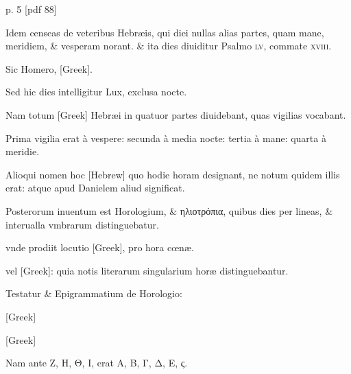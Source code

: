 \clearpage
p. 5 [pdf 88]
\begin{parnumbers}
Idem censeas de veteribus Hebræis,
qui diei nullas alias partes, quam mane, meridiem, \& vesperam norant.
\& ita dies diuiditur Psalmo \textsc{lv}, commate \textsc{xviii}.

Sic Homero,
\textgreek{[Greek]}.

Sed hic dies intelligitur Lux, exclusa nocte.

Nam totum \textgreek{[Greek]} Hebræi in quatuor partes diuidebant, quas vigilias
vocabant.

Prima vigilia erat à vespere: secunda à media nocte:
tertia à mane: quarta à meridie.

Alioqui nomen hoc \texthebrew{[Hebrew]} quo hodie
horam designant, ne notum quidem illis erat: atque apud Danielem
aliud significat.

Posterorum inuentum est Horologium, \& \textgreek{ηλιοτρόπια},
quibus dies per lineas, \& interualla vmbrarum distinguebatur.

vnde prodiit locutio \textgreek{[Greek]}, pro hora cœnæ.

vel \textgreek{[Greek]}:
 quia notis literarum singularium horæ distinguebantur.

Testatur \& Epigrammatium de Horologio:

\textgreek{[Greek]}

\textgreek{[Greek]}

Nam ante
\textgreek{Ζ, Η, Θ, Ι,} erat \textgreek{Α, Β, Γ, Δ, Ε, ς.}


\end{parnumbers}
